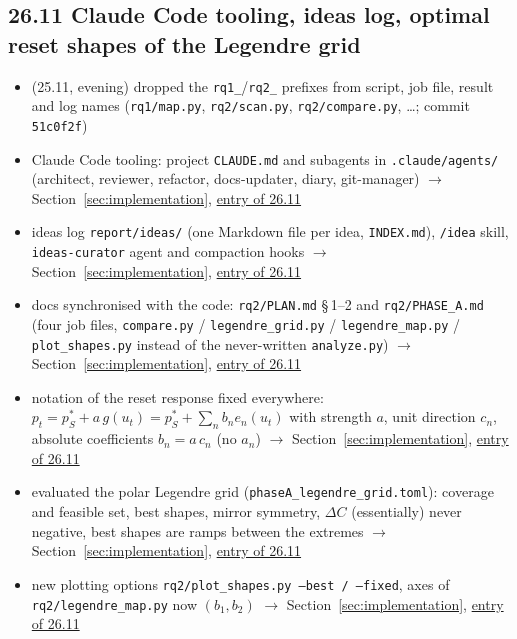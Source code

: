 \subsection*{26.11 \quad Claude Code tooling, ideas log, optimal reset shapes of the Legendre grid}
\begin{sloppypar}
\begin{itemize}
    \item (25.11, evening) dropped the \texttt{rq1\_}/\texttt{rq2\_} prefixes from script, job file, result and log
    names (\texttt{rq1/map.py}, \texttt{rq2/scan.py}, \texttt{rq2/compare.py}, \ldots; commit \texttt{51c0f2f})
    \item Claude Code tooling: project \texttt{CLAUDE.md} and subagents in \texttt{.claude/agents/} (architect,
    reviewer, refactor, docs-updater, diary, git-manager) $\to$ Section~\ref{sec:implementation},
    \hyperref[sec:tooling]{entry of 26.11}
    \item ideas log \texttt{report/ideas/} (one Markdown file per idea, \texttt{INDEX.md}), \texttt{/idea} skill,
    \texttt{ideas-curator} agent and compaction hooks $\to$ Section~\ref{sec:implementation},
    \hyperref[sec:tooling]{entry of 26.11}
    \item docs synchronised with the code: \texttt{rq2/PLAN.md} \S\,1--2 and \texttt{rq2/PHASE\_A.md} (four job files,
    \texttt{compare.py} / \texttt{legendre\_grid.py} / \texttt{legendre\_map.py} / \texttt{plot\_shapes.py}
    instead of the never-written \texttt{analyze.py}) $\to$ Section~\ref{sec:implementation},
    \hyperref[sec:tooling]{entry of 26.11}
    \item notation of the reset response fixed everywhere: $p_t = p^*_S + a\, g(u_t) = p^*_S + \sum_n b_n e_n(u_t)$
    with strength $a$, unit direction $c_n$, absolute coefficients $b_n = a\, c_n$ (no $a_n$) $\to$
    Section~\ref{sec:implementation}, \hyperref[sec:tooling]{entry of 26.11}
    \item evaluated the polar Legendre grid (\texttt{phaseA\_legendre\_grid.toml}): coverage and feasible set,
    best shapes, mirror symmetry, $\Delta C$ (essentially) never negative, best shapes are ramps between the
    extremes $\to$ Section~\ref{sec:implementation}, \hyperref[sec:rq2-optimal-shapes]{entry of 26.11}
    \item new plotting options \texttt{rq2/plot\_shapes.py --best / --fixed}, axes of \texttt{rq2/legendre\_map.py}
    now $(b_1, b_2)$ $\to$ Section~\ref{sec:implementation}, \hyperref[sec:rq2-optimal-shapes]{entry of 26.11}
\end{itemize}
\end{sloppypar}
